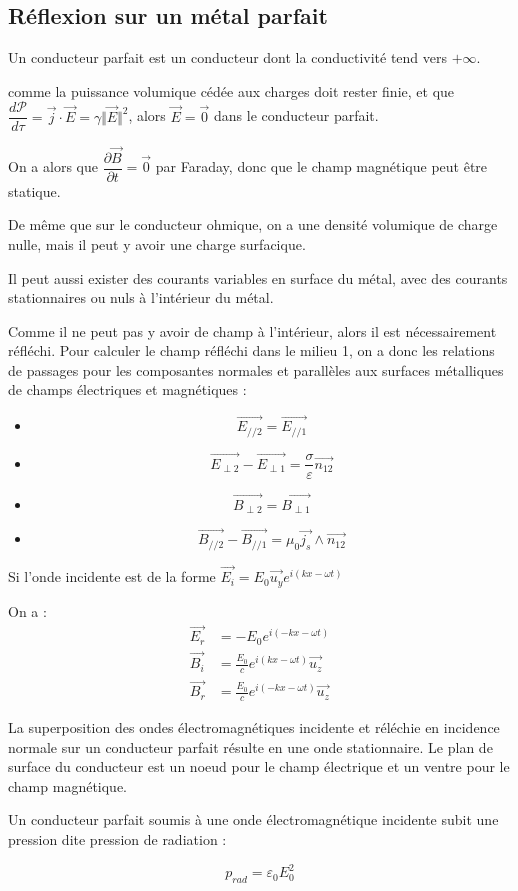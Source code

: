\documentclass[a4paper,12pt]{book}
\newcommand{\Def}[2]{\begin{tcolorbox}[colback=white,colframe=red!10!green!20!blue!75!, title=Définition : #1]#2\end{tcolorbox}}
\newcommand{\Thr}[2]{\begin{tcolorbox}[sharp corners, colback=white,colframe=red!10!blue!30!green!75!, title=Théorème : #1]#2\end{tcolorbox}}
\renewcommand{\Vec}[1]{\overrightarrow{#1}}
\begin{document}
\subsection{Réflexion sur un métal parfait}
\Def{Conducteur parfait}{Un conducteur parfait est un conducteur dont la conductivité tend vers $+\infty$.
\par comme la puissance volumique cédée aux charges doit rester finie, et que $\dfrac{d\mathcal{P}}{d\tau}=\Vec{j}\cdot\Vec{E} =\gamma\Vert\Vec{E}\Vert^2$, alors $\Vec{E}=\Vec{0}$ dans le conducteur parfait.
\par On a alors que $\dfrac{\partial\Vec{B}}{\partial t}=\Vec{0}$ par Faraday, donc que le champ magnétique peut être statique. 
\par De même que sur le conducteur ohmique, on a une densité volumique de charge nulle, mais il peut y avoir une charge surfacique. 
\par Il peut aussi exister des courants variables en surface du métal, avec des courants stationnaires ou nuls à l'intérieur du métal.}
\Thr{Réflexion}{Comme il ne peut pas y avoir de champ à l'intérieur, alors il est nécessairement réfléchi. Pour calculer le champ réfléchi dans le milieu 1, on a donc les relations de passages pour les composantes normales et parallèles aux surfaces métalliques de champs électriques et magnétiques :
\begin{itemize}
\item $$\Vec{E_{//2}} =\Vec{E_{//1}}$$
\item $$\Vec{E_{\perp2}}-\Vec{E_{\perp1}} = \frac{\sigma}{\varepsilon}\Vec{n_{12}}$$
\item $$\Vec{B_{\perp2}}=\Vec{B_{\perp1}}$$
\item $$\Vec{B_{//2}}-\Vec{B_{//1}}=\mu_0\Vec{j_s}\wedge\Vec{n_{12}}$$
\end{itemize}}
\Thr{Expression OPPM}{Si l'onde incidente est de la forme $\Vec{E_i} = E_0\vec{u_y}e^{i(kx-\omega t)}$
\par On a :
\begin{align*}
\Vec{E_r} &= -E_0e^{i(-kx-\omega t)}\\
\Vec{B_i} &= \frac{E_0}{c}e^{i(kx-\omega t)}\Vec{u_z}\\
\Vec{B_r} &= \frac{E_0}{c}e^{i(-kx-\omega t)}\Vec{u_z}
\end{align*}
\par La superposition des ondes électromagnétiques incidente et réléchie en incidence normale sur un conducteur parfait résulte en une onde stationnaire. Le plan de surface du conducteur est un noeud pour le champ électrique et un ventre pour le champ magnétique.}
\Thr{Pression de radiation}{Un conducteur parfait soumis à une onde électromagnétique incidente subit une pression dite pression de radiation :
\par $$p_{rad} = \varepsilon_0E_0^2$$}
\end{document}
